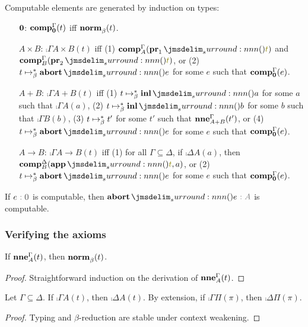 \documentclass[a4paper]{article}
\begin{document}
\begin{construction}
  Computable elements are generated by induction on types:
  \begin{itemize}
  \item[$\mathbf{0}$:] $\operatorname{\mathbf{comp}}^{\Gamma}_{\mathbf{0}}(t)$ iff $\operatorname{\mathbf{norm}}^{}_{\beta}(t)$.
  \item[$A \times B$:] $\comp{\Gamma}{A \times B}(t)$ iff (1) $\comp{\Gamma}{A}(\tmPrl{t})$ and $\comp{\Gamma}{B}(\tmPrr{t})$, or (2) $t \bRed* \tmAbort{e}$ for some $e$ such that $\operatorname{\mathbf{comp}}^{\Gamma}_{\mathbf{0}}(e)$.
  \item[$A + B$:] $\comp{\Gamma}{A + B}(t)$ iff (1) $t \bRed* \tmInl{a}$ for some $a$ such that $\comp{\Gamma}{A}(a)$, (2) $t \bRed* \tmInl{b}$ for some $b$ such that $\comp{\Gamma}{B}(b)$, (3) $t \bRed* t'$ for some $t'$ such that $\operatorname{\mathbf{nne}}^{\Gamma}_{A + B}(t')$, or (4) $t \bRed* \tmAbort{e}$ for some $e$ such that $\operatorname{\mathbf{comp}}^{\Gamma}_{\mathbf{0}}(e)$.
  \item[$A \to B$:] $\comp{\Gamma}{A \to B}(t)$ iff (1) for all $\Gamma \subseteq \Delta$, if $\comp{\Delta}{A}(a)$, then $\comp{\Delta}{B}(\tmApp{t}{a})$, or (2) $t \bRed* \tmAbort{e}$ for some $e$ such that $\operatorname{\mathbf{comp}}^{\Gamma}_{\mathbf{0}}(e)$.
  \end{itemize}
\end{construction}

\begin{observation}\label{thm:0005}
  If $e\tpAnno{\tpEmp}$ is computable, then $\tmAbort{e}\tpAnno{A}$ is computable.
\end{observation}

\subsubsection{Verifying the axioms}
\label{sec:0009}

\begin{lemma}\label{thm:0002}
  If $\operatorname{\mathbf{nne}}^{\Gamma}_{A}(t)$, then $\operatorname{\mathbf{norm}}^{}_{\beta}(t)$.
\end{lemma}
\begin{proof}
  Straightforward induction on the derivation of $\operatorname{\mathbf{nne}}^{\Gamma}_{A}(t)$.
\end{proof}

\begin{lemma}\label{thm:1001}
  Let $\Gamma \subseteq \Delta$.
  If $\comp{\Gamma}{A}(t)$, then $\comp{\Delta}{A}(t)$.
  By extension, if $\comp{\Gamma}{\Pi}(\pi)$, then $\comp{\Delta}{\Pi}(\pi)$.
\end{lemma}
\begin{proof}
  Typing and $\beta$-reduction are stable under context weakening.
\end{proof}
\end{document}
